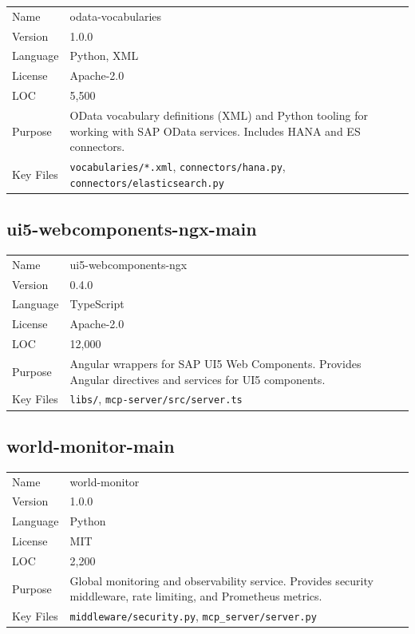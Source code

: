 \documentclass[11pt,a4paper]{article}
\begin{document}
\begin{tabular}{@{}L{4cm}L{10cm}@{}}
\toprule
Name & odata-vocabularies \\
Version & 1.0.0 \\
Language & Python, XML \\
License & Apache-2.0 \\
LOC & 5,500 \\
Purpose & OData vocabulary definitions (XML) and Python tooling for working with SAP OData services. Includes HANA and ES connectors. \\
Key Files & \texttt{vocabularies/*.xml}, \texttt{connectors/hana.py}, \texttt{connectors/elasticsearch.py} \\
\bottomrule
\end{tabular}

\subsection{ui5-webcomponents-ngx-main}

\begin{tabular}{@{}L{4cm}L{10cm}@{}}
\toprule
Name & ui5-webcomponents-ngx \\
Version & 0.4.0 \\
Language & TypeScript \\
License & Apache-2.0 \\
LOC & 12,000 \\
Purpose & Angular wrappers for SAP UI5 Web Components. Provides Angular directives and services for UI5 components. \\
Key Files & \texttt{libs/}, \texttt{mcp-server/src/server.ts} \\
\bottomrule
\end{tabular}

\subsection{world-monitor-main}

\begin{tabular}{@{}L{4cm}L{10cm}@{}}
\toprule
Name & world-monitor \\
Version & 1.0.0 \\
Language & Python \\
License & MIT \\
LOC & 2,200 \\
Purpose & Global monitoring and observability service. Provides security middleware, rate limiting, and Prometheus metrics. \\
Key Files & \texttt{middleware/security.py}, \texttt{mcp\_server/server.py} \\
\bottomrule
\end{tabular}
\end{document}
